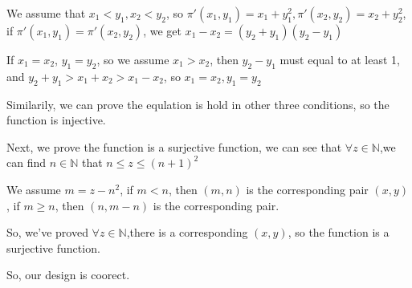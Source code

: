\documentclass[12pt,a4paper]{article}
\theoremstyle{definition}
\numberwithin{equation}{section}
\numberwithin{figure}{section}
\begin{document}
\begin{enumerate}
We assume that $x_1<y_1,x_2<y_2$, so $\pi'(x_1,y_1) = x_1+y_1^2, \pi'(x_2,y_2) = x_2+y_2^2$, if $\pi'(x_1,y_1) = \pi'(x_2,y_2)$, we get $x_1-x_2 = (y_2+y_1)(y_2-y_1)$

If $x_1 = x_2$, $y_1 = y_2$, so we assume $x_1 >x_2$, then $y_2-y_1$ must equal to at least 1, and $y_2 +y_1 > x_1+x_2 > x_1-x_2$, so $x_1=x_2,y_1=y_2$

Similarily, we can prove the equlation is hold in other three conditions, so the function is injective.

Next, we prove the function is a surjective function, we can see that $ \forall z \in \mathbb{N}$,we can find $n \in \mathbb{N}$ that $n \leq z \leq (n+1)^2$

We assume $ m = z - n^2 $, if $ m < n $, then $(m,n)$ is the corresponding pair $(x,y)$, if $m \geq n$, then $(n,m-n)$ is the corresponding pair.

So, we've proved $\forall z \in \mathbb{N}$,there is a corresponding $(x,y)$, so the function is a surjective function.

So, our design is coorect.

\end{enumerate}


\end{document}
